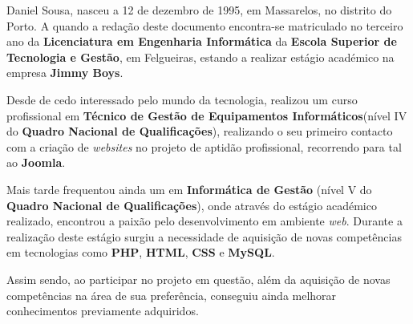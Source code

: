 
Daniel Sousa, nasceu a 12 de dezembro de 1995, em Massarelos, no distrito do Porto. A quando a redação deste documento encontra-se matriculado no terceiro ano da \textbf{Licenciatura em Engenharia Informática} da \textbf{Escola Superior de Tecnologia e Gestão}, em Felgueiras, estando a realizar estágio académico na empresa \textbf{Jimmy Boys}.

Desde de cedo interessado pelo mundo da tecnologia, realizou um curso profissional em \textbf{Técnico de Gestão de Equipamentos Informáticos}(nível IV do \textbf{Quadro Nacional de Qualificações}), realizando o seu primeiro contacto com a criação de \textit{websites} no projeto de aptidão profissional, recorrendo para tal ao  \textbf{Joomla}.

Mais tarde frequentou ainda um \textbf{} em \textbf{Informática de Gestão} (nível V do \textbf{Quadro Nacional de Qualificações}), onde através do estágio académico realizado, encontrou a paixão pelo desenvolvimento em ambiente \textit{web}. Durante a realização deste estágio surgiu a necessidade de aquisição de novas competências em tecnologias como \textbf{PHP}, \textbf{HTML}, \textbf{CSS} e \textbf{MySQL}.

Assim sendo, ao participar no projeto em questão, além da aquisição de novas competências na área de sua preferência, conseguiu ainda melhorar conhecimentos previamente adquiridos.

\newpage